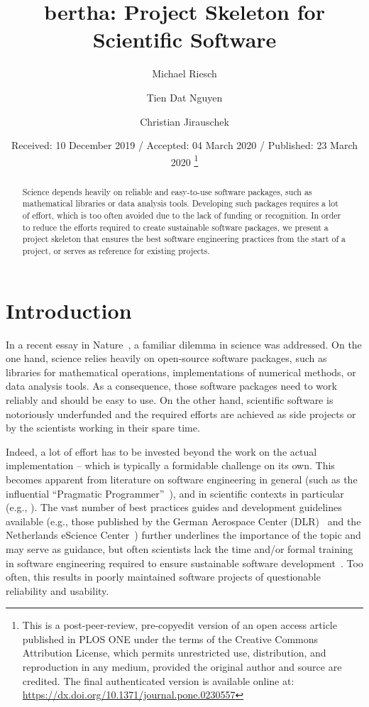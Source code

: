 \documentclass[@CLASSOPTIONS@]{tumarticle}
\title{bertha: Project Skeleton for Scientific Software}
\author[affil={1,$\dagger$}, orcid=0000-0002-4030-2818,
  email={michael.riesch@tum.de}]{Michael Riesch}
\author[affil=1,orcid=0000-0003-2522-7335]{Tien Dat Nguyen}
\author[affil=1]{Christian Jirauschek}
\affil{TUM School of Computation, Information and Technology, Technical
  University of Munich, Arcisstr. 21, 80333 Munich, Germany}
\affil[mark=$\dagger$]{now with The \LaTeX{} Institute, TeXarkana, TeXas}
\date{Received: 10 December 2019 / Accepted: 04 March 2020 / Published:
  23 March 2020
  \thanks{This is a post-peer-review, pre-copyedit version of an open access
    article published in PLOS ONE under the terms of the Creative Commons
    Attribution License, which permits unrestricted use, distribution, and
    reproduction in any medium, provided the original author and source are
    credited. The final authenticated version is available online at:
    \url{https://dx.doi.org/10.1371/journal.pone.0230557}}}
\begin{document}
\maketitle

\begin{abstract}
  Science depends heavily on reliable and easy-to-use software packages, such
  as mathematical libraries or data analysis tools. Developing such packages
  requires a lot of effort, which is too often avoided due to the lack of
  funding or recognition. In order to reduce the efforts required to create
  sustainable software packages, we present a project skeleton that ensures
  the best software engineering practices from the start of a project, or
  serves as reference for existing projects.
\end{abstract}

\section{Introduction}

In a recent essay in Nature~\cite{nowogrodzki2019}, a familiar dilemma in
science was addressed. On the one hand, science relies heavily on
open-source software packages, such as libraries for mathematical operations,
implementations of numerical methods, or data analysis tools. As a
consequence, those software packages need to work reliably and should be
easy to use. On the other hand, scientific software is notoriously
underfunded and the required efforts are achieved as side projects or by the
scientists working in their spare time.

Indeed, a lot of effort has to be invested beyond the work on the actual
implementation -- which is typically a formidable challenge on its own. This
becomes apparent from literature on software engineering in general (such as
the influential ``Pragmatic Programmer''~\cite{hunt1999pragmatic}), and in
scientific contexts in particular (e.g.,
\cite{prlic2012, bangerth2013, wilson2014, wilson2017}). The vast number of
best practices guides and development guidelines available (e.g., those
published by the German Aerospace Center (DLR)~\cite{schlauch2018dlrguide}
and the Netherlands eScience Center~\cite{netherlands-guide2019}) further
underlines the importance of the topic and may serve as guidance, but often
scientists lack the time and/or formal training in software engineering
required to ensure sustainable software
development~\cite{nowogrodzki2019, wilson2014, wilson2017}. Too often, this
results in poorly maintained software projects of questionable reliability
and usability.
\end{document}
